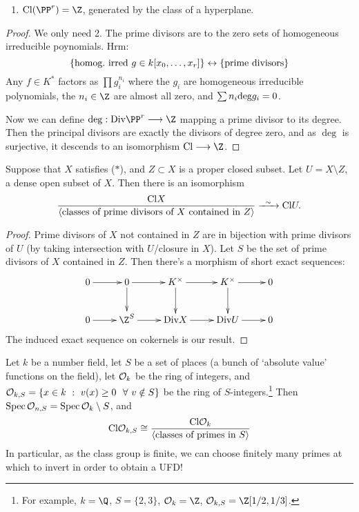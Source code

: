 \documentclass[11pt]{article}
\begin{document}
\begin{Nov10}
\begin{prop*}
\begin{enumerate}
\item $\DivisorClass(\PP^r)=\Z$, generated by the class of a hyperplane.
\end{enumerate}
\end{prop*}
\begin{proof}
We only need 2. The prime divisors are to the zero sets of homogeneous irreducible poynomials. Hrm:
\[\{\textup{homog.\ irred $g\in k[x_0,\ldots,x_r]$}\}\leftrightarrow\{\textup{prime divisors}\}\]
Any $f\in K^*$ factors as
$\prod g_i^{n_i}$
where the $g_i$ are homogeneous irreducible polynomials, the $n_i\in\Z$ are almost all zero, and $\sum n_i\textup{deg}g_i=0$.

Now we can define $\deg:\WeilDivisors\PP^r\to\Z$ mapping a prime divisor to its degree. Then the principal divisors are exactly the divisors of degree zero, and as $\deg$ is surjective, it descends to an isomorphism $\DivisorClass\to\Z$.
\end{proof}
\begin{prop*}
Suppose that $X$ satisfies ($*$), and $Z\subset X$ is a proper closed subset. Let $U=X\setminus Z$, a dense open subset of $X$. Then there is an isomorphism
\[\frac{\DivisorClass X}{\langle \textup{classes of prime divisors of $X$ contained in $Z$}\rangle}\weakequiv\DivisorClass U.\]
\end{prop*}
\begin{proof}
Prime divisors of $X$ not contained in $Z$ are in bijection with prime divisors of $U$ (by taking intersection with $U$/closure in $X$). Let $S$ be the set of prime divisors of $X$ contained in $Z$. Then there's a morphism of short exact sequences:
\[\xymatrix{
0\ar[r]&0\ar[d]\ar[r]&K^\times\ar[r]\ar[d]&K^\times\ar[d]\ar[r]&0\\
0\ar[r]&
\Z^S\ar[r]&
\WeilDivisors X\ar[r]&
\WeilDivisors U\ar[r]&
0
}\]
The induced exact sequence on cokernels is our result.
\end{proof}
\begin{cor*}
Let $k$ be a number field, let $S$ be a set of places (a bunch of `absolute value' functions on the field), let $\mathcal{O}_k$ be the ring of integers, and $\calO_{k,S}=\{x\in k\ :\ v(x)\geq0\ \ \forall\ v\notin S\}$ be the ring of $S$-integers.\footnote{For example, $k=\Q$, $S=\{2,3\}$, $\calO_k=\Z$, $\calO_{k,S}=\Z[1/2,1/3]$.} Then $\operatorname{Spec}\mathcal{O}_{n,S}=\operatorname{Spec}\mathcal{O}_k\setminus S$, and
\[\textup{Cl}\mathcal{O}_{k,S}\cong\frac{\textup{Cl}\mathcal{O}_k}{\langle \textup{classes of primes in $S$}\rangle}\]
In particular, as the class group is finite, we can choose finitely many primes at which to invert in order to obtain a UFD!
\end{cor*}
\end{Nov10}
\end{document}
